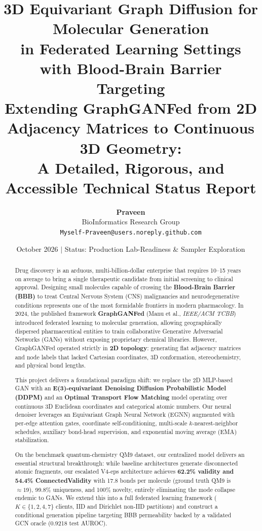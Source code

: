 \documentclass[12pt, a4paper]{article}
\title{
    \vspace{-1.2cm}
    \textbf{\Large 3D Equivariant Graph Diffusion for Molecular Generation\\
    in Federated Learning Settings with Blood-Brain Barrier Targeting}\\[0.6em]
    \large Extending GraphGANFed from 2D Adjacency Matrices to Continuous 3D Geometry:\\[0.2em]
    \normalsize A Detailed, Rigorous, and Accessible Technical Status Report
}
\author{
    \textbf{Praveen}\\
    BioInformatics Research Group\\
    \texttt{Myself-Praveen@users.noreply.github.com}
}
\date{October 2026 \quad $\vert$ \quad Status: Production Lab-Readiness \& Sampler Exploration}
\begin{document}
\maketitle
\thispagestyle{empty}

\begin{abstract}
\noindent
Drug discovery is an arduous, multi-billion-dollar enterprise that requires 10--15 years on average to bring a single therapeutic candidate from initial screening to clinical approval. Designing small molecules capable of crossing the \textbf{Blood-Brain Barrier (BBB)} to treat Central Nervous System (CNS) malignancies and neurodegenerative conditions represents one of the most formidable frontiers in modern pharmacology. In 2024, the published framework \textbf{GraphGANFed} (Manu et al., \textit{IEEE/ACM TCBB}) introduced federated learning to molecular generation, allowing geographically dispersed pharmaceutical entities to train collaborative Generative Adversarial Networks (GANs) without exposing proprietary chemical libraries. However, GraphGANFed operated strictly in \textbf{2D topology}: generating flat adjacency matrices and node labels that lacked Cartesian coordinates, 3D conformation, stereochemistry, and physical bond lengths.

This project delivers a foundational paradigm shift: we replace the 2D MLP-based GAN with an \textbf{E(3)-equivariant Denoising Diffusion Probabilistic Model (DDPM)} and an \textbf{Optimal Transport Flow Matching} model operating over continuous 3D Euclidean coordinates and categorical atomic numbers. Our neural denoiser leverages an Equivariant Graph Neural Network (EGNN) augmented with per-edge attention gates, coordinate self-conditioning, multi-scale $k$-nearest-neighbor schedules, auxiliary bond-head supervision, and exponential moving average (EMA) stabilization.

On the benchmark quantum-chemistry QM9 dataset, our centralized model delivers an essential structural breakthrough: while baseline architectures generate disconnected atomic fragments, our escalated V4-eps architecture achieves \textbf{62.2\% validity and 54.4\% ConnectedValidity} with 17.8 bonds per molecule (ground truth QM9 is $\approx 19$), 99.8\% uniqueness, and 100\% novelty, entirely eliminating the mode collapse endemic to GANs. We extend this into a full federated learning framework ($K \in \{1, 2, 4, 7\}$ clients, IID and Dirichlet non-IID partitions) and construct a conditional generation pipeline targeting BBB permeability backed by a validated GCN oracle (0.9218 test AUROC).


\end{abstract}
\end{document}
